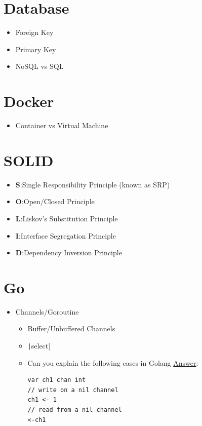\documentclass[]{article}
\begin{document}
\begin{multicols}{2}
  \section{Database}

  \begin{itemize}
    \item Foreign Key
    \item Primary Key
    \item NoSQL vs SQL
  \end{itemize}

  \section{Docker}

  \begin{itemize}
    \item Container vs Virtual Machine
  \end{itemize}

  \section{SOLID}

  \begin{itemize}
    \item \textbf{S}:\@ Single Responsibility Principle (known as SRP)
    \item \textbf{O}:\@ Open/Closed Principle
    \item \textbf{L}:\@ Liskov’s Substitution Principle
    \item \textbf{I}:\@ Interface Segregation Principle
    \item \textbf{D}:\@ Dependency Inversion Principle
  \end{itemize}

  \section{Go}

  \begin{itemize}
    \item Channels/Goroutine
      \begin{itemize}
        \item Buffer/Unbuffered Channels
        \item \texttt|select|
        \item Can you explain the following cases in Golang \href{https://stackoverflow.com/questions/39015602/how-does-a-non-initialized-channel-behave)}{Answer}:
          \begin{verbatim}
var ch1 chan int
// write on a nil channel
ch1 <- 1
// read from a nil channel
<-ch1


\end{verbatim}
\end{itemize}
\end{itemize}
\end{multicols}
\end{document}
